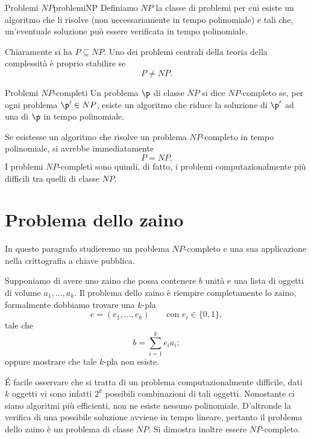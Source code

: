 	\begin{defn}{Problemi \(NP\)}{problemiNP}
	Definiamo \(NP\) la classe di problemi per cui esiste un algoritmo che li risolve (non necessariamente in tempo polinomiale) e tali che, un'eventuale soluzione può essere verificata in tempo polinomiale.
	\end{defn}

	\begin{oss}
	Chiaramente si ha \(P\subseteq NP\). Uno dei problemi centrali della teoria della complessità è proprio stabilire se
		\[
		P \neq NP.
		\]
	\end{oss}

	\begin{defn}{Problemi \(NP\)-completi}{}
	Un problema \(\p\) di classe \(NP\) si dice \(NP\)-completo se, per ogni problema \(\p'\in NP\), esiste un algoritmo che riduce la soluzione di \(\p'\) ad una di \(\p\) in tempo polinomiale.
	\end{defn}

	\begin{oss}
	Se esistesse un algoritmo che risolve un problema \(NP\)-completo in tempo polinomiale, si avrebbe immediatamente
		\[
		P = NP.
		\]
	I problemi \(NP\)-completi sono quindi, di fatto, i problemi computazionalmente più difficili tra quelli di classe \(NP\).
	\end{oss}
\section{Problema dello zaino}

	In questo paragrafo studieremo un problema \(NP\)-completo e una sua applicazione nella crittografia a chiave pubblica.

	Supponiamo di avere uno zaino che possa contenere \(b\) unità e una lista di oggetti di volume \(a_1, \ldots, a_k\).
	Il problema dello zaino è riempire completamente lo zaino, formalmente dobbiamo trovare una \(k\)-pla
		\[
		e = (e_1, \ldots, e_k) \qquad\text{con }e_i \in \{0,1\},
		\]
	tale che
		\[
		b = \sum_{i=1}^k e_i a_i;
		\]
	oppure mostrare che tale \(k\)-pla non esiste.

	\'E facile osservare che si tratta di un problema computazionalmente difficile, dati \(k\) oggetti vi sono infatti \(2^k\) possibili combinazioni di tali oggetti.
	Nonostante ci siano algoritmi più efficienti, non ne esiste nessuno polinomiale.
	D'altronde la verifica di una possibile soluzione avviene in tempo lineare, pertanto il problema dello zaino è un problema di classe \(NP\). Si dimostra inoltre essere \(NP\)-completo.


